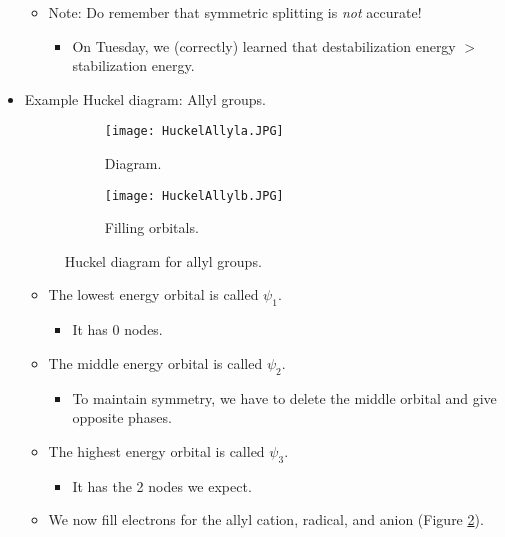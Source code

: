 \documentclass[../notes.tex]{subfiles}
\begin{document}
\begin{itemize}
\begin{itemize}
        \item Note: Do remember that symmetric splitting is \emph{not} accurate!
        \begin{itemize}
            \item On Tuesday, we (correctly) learned that destabilization energy $>$ stabilization energy.
        \end{itemize}
    \end{itemize}
    \item Example Huckel diagram: Allyl groups.
    \begin{figure}[H]
        \centering
        \begin{subfigure}[b]{0.4\linewidth}
            \centering
            \texttt{[image: HuckelAllyla.JPG]}
            \caption{Diagram.}
            \label{fig:HuckelAllyla}
        \end{subfigure}
        \begin{subfigure}[b]{0.4\linewidth}
            \centering
            \texttt{[image: HuckelAllylb.JPG]}
            \caption{Filling orbitals.}
            \label{fig:HuckelAllylb}
        \end{subfigure}
        \caption{Huckel diagram for allyl groups.}
        \label{fig:HuckelAllyl}
    \end{figure}
    \begin{itemize}
        \item The lowest energy orbital is called $\psi_1$.
        \begin{itemize}
            \item It has 0 nodes.
        \end{itemize}
        \item The middle energy orbital is called $\psi_2$.
        \begin{itemize}
            \item To maintain symmetry, we have to delete the middle orbital and give opposite phases.
        \end{itemize}
        \item The highest energy orbital is called $\psi_3$.
        \begin{itemize}
            \item It has the 2 nodes we expect.
        \end{itemize}
        \item We now fill electrons for the allyl cation, radical, and anion (Figure \ref{fig:HuckelAllylb}).
        \begin{itemize}

\end{itemize}
\end{itemize}
\end{itemize}
\end{document}
